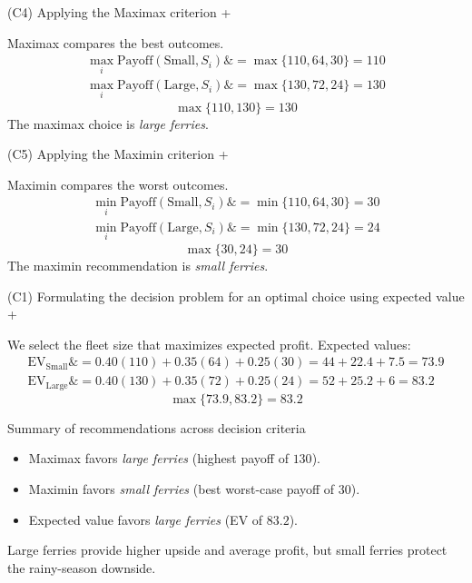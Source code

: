 \documentclass[11pt]{article}
\begin{document}
	
	
	
	(C4) Applying the Maximax criterion
	+
	
	
	Maximax compares the best outcomes.
	\[
	\begin{aligned}
		\max_i \text{Payoff}(\text{Small}, S_i) \&= \max\{110, 64, 30\} = 110 \\
		\max_i \text{Payoff}(\text{Large}, S_i) \&= \max\{130, 72, 24\} = 130
	\end{aligned}
	\]
	\[
	\max\{110, 130\} = 130
	\]
	The maximax choice is \emph{large ferries}.
	
	
	
	
	
	(C5) Applying the Maximin criterion
	+
	
	
	Maximin compares the worst outcomes.
	\[
	\begin{aligned}
		\min_i \text{Payoff}(\text{Small}, S_i) \&= \min\{110, 64, 30\} = 30 \\
		\min_i \text{Payoff}(\text{Large}, S_i) \&= \min\{130, 72, 24\} = 24
	\end{aligned}
	\]
	\[
	\max\{30, 24\} = 30
	\]
	The maximin recommendation is \emph{small ferries}.
	
	
	
	
	
	(C1) Formulating the decision problem for an optimal choice using expected value
	+
	
	
	We select the fleet size that maximizes expected profit. Expected values:
	\[
	\begin{aligned}
		\mathrm{EV}_{\text{Small}} \&= 0.40(110) + 0.35(64) + 0.25(30) = 44 + 22.4 + 7.5 = 73.9 \\
		\mathrm{EV}_{\text{Large}} \&= 0.40(130) + 0.35(72) + 0.25(24) = 52 + 25.2 + 6 = 83.2
	\end{aligned}
	\]
	\[
	\max\{73.9, 83.2\} = 83.2
	\]
	
	Summary of recommendations across decision criteria
	\begin{itemize}
		\item Maximax favors \emph{large ferries} (highest payoff of $130$).
		\item Maximin favors \emph{small ferries} (best worst-case payoff of $30$).
		\item Expected value favors \emph{large ferries} (EV of $83.2$).
	\end{itemize}
	
	
	Large ferries provide higher upside and average profit, but small ferries protect the rainy-season downside.
	
\end{document}
